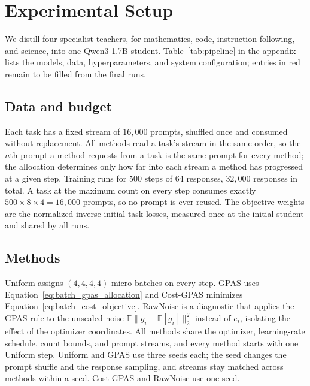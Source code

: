 \section{Experimental Setup}
\label{sec:experiments}

We distill four specialist teachers, for mathematics, code, instruction
following, and science, into one Qwen3-1.7B student. Table~\ref{tab:pipeline}
in the appendix lists the models, data, hyperparameters, and system
configuration; entries in red remain to be filled from the final runs.

\subsection{Data and budget}

Each task has a fixed stream of $16{,}000$ prompts, shuffled once and consumed
without replacement. All methods read a task's stream in the same order, so
the $n$th prompt a method requests from a task is the same prompt for every
method; the allocation determines only how far into each stream a method has
progressed at a given step. Training runs for $500$ steps of $64$ responses,
$32{,}000$ responses in total. A task at the maximum count on every step
consumes exactly $500\times8\times4=16{,}000$ prompts, so no prompt is ever
reused. The objective weights are the normalized inverse initial task losses,
measured once at the initial student and shared by all runs.

\subsection{Methods}

Uniform assigns $(4,4,4,4)$ micro-batches on every step. GPAS uses
Equation~\ref{eq:batch_gpas_allocation} and Cost-GPAS minimizes
Equation~\ref{eq:batch_cost_objective}. RawNoise is a diagnostic that applies
the GPAS rule to the unscaled noise $\mathbb E\|g_i-\mathbb E[g_i]\|_2^2$
instead of $e_i$, isolating the effect of the optimizer coordinates. All
methods share the optimizer, learning-rate schedule, count bounds, and prompt
streams, and every method starts with one Uniform step. Uniform and GPAS use
three seeds each; the seed changes the prompt shuffle and the response
sampling, and streams stay matched across methods within a seed. Cost-GPAS
and RawNoise use one seed. 

